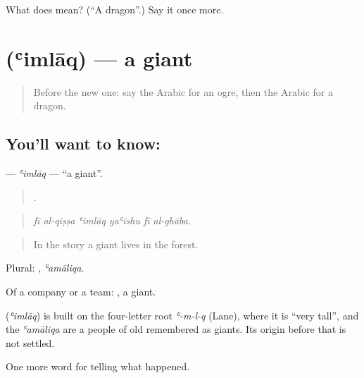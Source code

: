 \begin{tcolorbox}[breakable,colback=teal!4,colframe=teal!35!black,title={Before you move on}]
What does  mean? (\textquotedblleft{}A dragon\textquotedblright{}.) Say it once more.
\end{tcolorbox}
\section[\texorpdfstring{\ar{عملاق} (ʿimlāq)}{عملاق (ʿimlāq)}]{ (ʿimlāq) — a giant}

\label{lesson:AR-C335-imlaq}



\begin{quote}
Before the new one: say the Arabic for an ogre, then the Arabic for a dragon.
\end{quote}

\subsection*{You'll want to know: }
\textbf{} — \emph{ʿimlāq} — \textquotedblleft{}a giant\textquotedblright{}.

\begin{quote}
     .
\end{quote}

\begin{quote}
\emph{fī al-qiṣṣa ʿimlāq yaʿīshu fī al-ghāba.}
\end{quote}

\begin{quote}
In the story a giant lives in the forest.
\end{quote}

Plural: , \emph{ʿamāliqa}.

Of a company or a team: , a giant.

\begin{cousinweb}
\textbf{} (\emph{ʿimlāq}) is built on the four-letter root \emph{ʿ-m-l-q} (Lane), where it is \textquotedblleft{}very tall\textquotedblright{}, and the \emph{ʿamāliqa} are a people of old remembered as giants. Its origin before that is not settled.
\end{cousinweb}

\begin{grammarlens}[title={What you've built}]
One more word for telling what happened.
\end{grammarlens}

